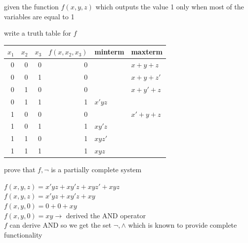 \documentclass[a4paper,12pt]{article}
\begin{document}
\begin{question}
given the function \(f(x,y,z)\) which outputs the value 1 only when most of the variables are equal to 1\\[0pt]
\begin{subquestion}
write a truth table for \(f\)\\[0pt]
\begin{answer}
\begin{center}
\begin{tabular}{rrrrll}
\(x_1\) & \(x_2\) & \(x_3\) & \(f(x,x_2,x_3)\) & minterm & maxterm\\[0pt]
\hline
0 & 0 & 0 & 0 &  & \(x+y+z\)\\[0pt]
0 & 0 & 1 & 0 &  & \(x+y+z'\)\\[0pt]
0 & 1 & 0 & 0 &  & \(x+y'+z\)\\[0pt]
0 & 1 & 1 & 1 & \(x'yz\) & \\[0pt]
1 & 0 & 0 & 0 &  & \(x'+y+z\)\\[0pt]
1 & 0 & 1 & 1 & \(xy'z\) & \\[0pt]
1 & 1 & 0 & 1 & \(xyz'\) & \\[0pt]
1 & 1 & 1 & 1 & \(xyz\) & \\[0pt]
\end{tabular}
\end{center}
\end{answer}
\end{subquestion}
\begin{subquestion}
prove that \(f,\lnot\) is a partially complete system\\[0pt]
\begin{answer}
\(f(x,y,z)=x'yz+xy'z+xyz'+xyz\)\\[0pt]
\(f(x,y,z)=x'yz+xy'z+xy\)\\[0pt]
\(f(x,y,0)=0+0+xy\)\\[0pt]
\(f(x,y,0)=xy \longrightarrow\) derived the AND operator\\[0pt]
\(f\) can derive AND so we get the set \(\lnot, \land\) which is known to provide complete functionality\\[0pt]
\end{answer}
\end{subquestion}
\end{question}
\end{document}
